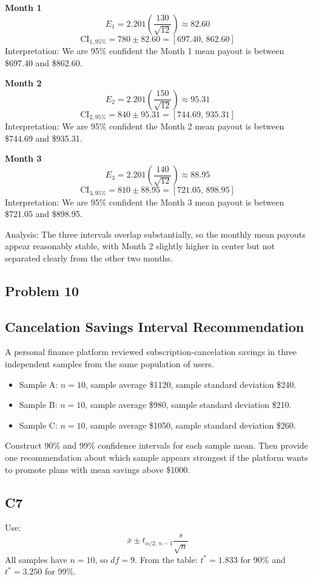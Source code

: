 \textbf{Month 1}
\[
E_1=2.201\left(\frac{130}{\sqrt{12}}\right)\approx 82.60
\]
\[
\text{CI}_{1,95\%}=780\pm 82.60=[697.40,\,862.60]
\]
Interpretation: We are 95\% confident the Month 1 mean payout is between \$697.40 and \$862.60.

\textbf{Month 2}
\[
E_2=2.201\left(\frac{150}{\sqrt{12}}\right)\approx 95.31
\]
\[
\text{CI}_{2,95\%}=840\pm 95.31=[744.69,\,935.31]
\]
Interpretation: We are 95\% confident the Month 2 mean payout is between \$744.69 and \$935.31.

\textbf{Month 3}
\[
E_3=2.201\left(\frac{140}{\sqrt{12}}\right)\approx 88.95
\]
\[
\text{CI}_{3,95\%}=810\pm 88.95=[721.05,\,898.95]
\]
Interpretation: We are 95\% confident the Month 3 mean payout is between \$721.05 and \$898.95.

Analysis: The three intervals overlap substantially, so the monthly mean payouts appear reasonably stable, with Month 2 slightly higher in center but not separated clearly from the other two months.

\subsection*{Problem 10}
\subsection*{Cancelation Savings Interval Recommendation}
A personal finance platform reviewed subscription-cancelation savings in three independent samples from the same population of users.
\begin{itemize}
  \item Sample A: \(n=10\), sample average \$1120, sample standard deviation \$240.
  \item Sample B: \(n=10\), sample average \$980, sample standard deviation \$210.
  \item Sample C: \(n=10\), sample average \$1050, sample standard deviation \$260.
\end{itemize}
Construct 90\% and 99\% confidence intervals for each sample mean. Then provide one recommendation about which sample appears strongest if the platform wants to promote plans with mean savings above \$1000.

\subsection*{C7}
Use:
\[
\bar{x} \pm t_{\alpha/2,\,n-1}\frac{s}{\sqrt{n}}
\]
All samples have \(n=10\), so \(df=9\). From the table: \(t^*=1.833\) for 90\% and \(t^*=3.250\) for 99\%.

